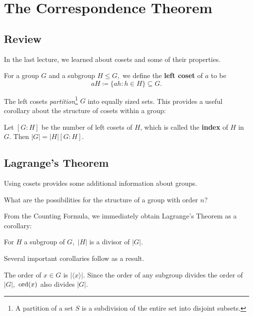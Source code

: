 
\section{The Correspondence Theorem}
\subsection{Review}

In the last lecture, we learned about cosets and some of their properties. 

\begin{definition}
For a group $G$ and a subgroup $H \leq G,$ we define the \textbf{left coset} of $a$ to be 
\[
aH \coloneqq \{ah : h \in H\} \subseteq G.
\]
\end{definition}

The left cosets \emph{partition}\footnote{A partition of a set $S$ is a subdivision of the entire set into disjoint subsets.} $G$ into equally sized sets. This provides a useful corollary about the structure of cosets within a group:

\begin{corollary}
Let $[G:H]$ be the number of left cosets of $H$, which is called the \textbf{index} of $H$ in $G.$ Then $|G| = |H|[G:H]$.
\end{corollary}

\subsection{Lagrange's Theorem}
Using cosets provides some additional information about groups.
\begin{qq}
What are the possibilities for the structure of a group with order $n$?
\end{qq}

From the Counting Formula, we immediately obtain Lagrange's Theorem as a corollary:
\begin{theorem} 
For $H$ a subgroup of $G,$ $|H|$ is a divisor of $|G|.$
\end{theorem}

Several important corollaries follow as a result.
\begin{corollary}
The order of $x \in G$ is $|\langle x \rangle|.$ Since the order of any subgroup divides the order of $|G|,$ $\operatorname{ord}(x)$ also divides $|G|$.
\end{corollary}

